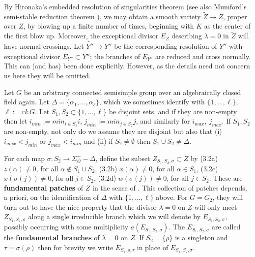 By Hironaka's embedded resolution of
singularities theorem (see also Mumford's semi-stable reduction theorem 
\cite{K}), we may obtain a smooth variety
$\tilde{Z}\rightarrow Z$, proper over $Z$, by blowing
up a finite number of times, beginning with $K$
as the center of the first blow up. Moreover, the exceptional
divisor $E_Z$ describing $\lambda =0$ in 
$\tilde{Z}$ will have normal crossings.
Let $\tilde{Y''}\rightarrow Y''$ be the
corresponding resolution of $Y''$ with exceptional divisor
$E_{Y''}\subset \tilde{Y''}$; the branches of $E_{Y''}$ are reduced and
cross normally. This can (and has) been done explicitly. 
However, as the details need not concern us here they will be omitted.
\par
Let $G$ be an arbitrary connected semisimple
group over an algebraically closed field again.
Let $\Delta=\{\alpha_1,...,\alpha_\ell\}$, which we sometimes identify
with $\{1,...,\ell\}$, $\ell :=rk\, G$. Let $S_1,S_2\subset \{1,...,\ell\}$
be disjoint sets, and if they are
non-empty then let $i_{min}:=min_{i\in S_1}i$,
$j_{min}:=min_{j\in S_2}j$, and similarly for $i_{max},\ j_{max}$. If
$S_1,S_2$ are non-empty, not only do we assume
they are disjoint but also that
(i) $i_{max}<j_{min}$ or $j_{max}<i_{min}$
and (ii) if $S_2\not=\emptyset$ then
$S_1\cup S_2\not=\Delta$.
\par
For each map $\sigma :S_2 \rightarrow \Sigma_G^+ -\Delta$,
define the subset $Z_{S_1,S_2,\sigma}\subset Z$ by
\newline
(3.2a) $z(\alpha)\not= 0$, for all 
$\alpha\notin S_1\cup S_2$,
\newline
(3.2b) $x(\alpha)\not= 0$, for all $\alpha\in S_1$,
\newline
(3.2c) $x(\sigma(j))\not= 0$, for all $j\in S_2$,
\newline
(3.2d) $w(\sigma(j))\not= 0$, for all $j\in S_2$.
\newline
These are {\bf fundamental patches} of $Z$ in the sense of \cite{H1}. 
This collection of patches depends, a priori, on the
identification of $\Delta$ with $\{1,...,\ell\}$ above.
For $G=G_2$, they will turn out to have the
nice property that the divisor $\lambda =0$ on $Z$ will only meet
$Z_{S_1,S_2,\sigma}$ along a single irreducible branch which we will denote
by $E_{S_1,S_2,\sigma}$, possibly
occurring with some multiplicity $a(E_{S_1,S_2,\sigma})$.
The $E_{S_1,S_2,\sigma}$ are called the {\bf fundamental branches} of
$\lambda =0$ on $Z$. If $S_2=\{\rho\}$ is a singleton and 
$\tau=\sigma(\rho)$ then for brevity
we write $E_{S_1,\rho,\tau}$ in place of $E_{S_1,S_2,\sigma}$.
